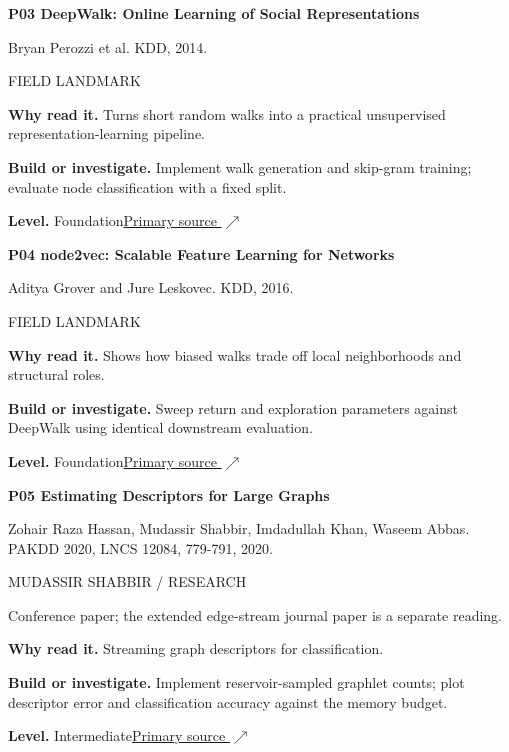 \documentclass[11pt,letterpaper]{article}
\begin{document}
\begin{minipage}{\linewidth}
{\large\bfseries P03 DeepWalk: Online Learning of Social Representations}\par
Bryan Perozzi et al. KDD, 2014.\par
\textcolor{ink}{\small FIELD LANDMARK}\par
\textbf{Why read it.} Turns short random walks into a practical unsupervised representation-learning pipeline.\par
\textbf{Build or investigate.} Implement walk generation and skip-gram training; evaluate node classification with a fixed split.\par
\textbf{Level.} Foundation\quad\href{https://arxiv.org/abs/1403.6652}{Primary source $\nearrow$}\par
\end{minipage}\par\vspace{10pt}
\begin{minipage}{\linewidth}
{\large\bfseries P04 node2vec: Scalable Feature Learning for Networks}\par
Aditya Grover and Jure Leskovec. KDD, 2016.\par
\textcolor{ink}{\small FIELD LANDMARK}\par
\textbf{Why read it.} Shows how biased walks trade off local neighborhoods and structural roles.\par
\textbf{Build or investigate.} Sweep return and exploration parameters against DeepWalk using identical downstream evaluation.\par
\textbf{Level.} Foundation\quad\href{https://arxiv.org/abs/1607.00653}{Primary source $\nearrow$}\par
\end{minipage}\par\vspace{10pt}
\begin{minipage}{\linewidth}
{\large\bfseries P05 Estimating Descriptors for Large Graphs}\par
Zohair Raza Hassan, Mudassir Shabbir, Imdadullah Khan, Waseem Abbas. PAKDD 2020, LNCS 12084, 779-791, 2020.\par
\textcolor{ink}{\small MUDASSIR SHABBIR / RESEARCH}\par
{\small Conference paper; the extended edge-stream journal paper is a separate reading.}\par
\textbf{Why read it.} Streaming graph descriptors for classification.\par
\textbf{Build or investigate.} Implement reservoir-sampled graphlet counts; plot descriptor error and classification accuracy against the memory budget.\par
\textbf{Level.} Intermediate\quad\href{https://doi.org/10.1007/978-3-030-47426-3_60}{Primary source $\nearrow$}\par
\end{minipage}\par\vspace{10pt}
\end{document}
